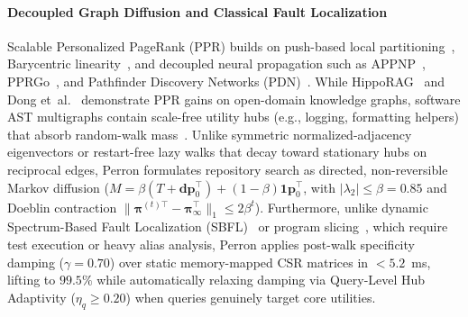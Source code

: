 \documentclass[10pt]{article}
\begin{document}
\paragraph{Decoupled Graph Diffusion and Classical Fault Localization}
Scalable Personalized PageRank (PPR) builds on push-based local partitioning~\cite{andersen2006local}, Barycentric linearity~\cite{jeh2003scaling}, and decoupled neural propagation such as APPNP~\cite{klicpera2019predict}, PPRGo~\cite{bojchevski2020scaling}, and Pathfinder Discovery Networks (PDN)~\cite{rozemberczki2021pdn}. While HippoRAG~\cite{gutierrez2024hipporag} and Dong et~al.~\cite{dong2024dont} demonstrate PPR gains on open-domain knowledge graphs, software AST multigraphs contain scale-free utility hubs (e.g., logging, formatting helpers) that absorb random-walk mass~\cite{liben2007link}. Unlike symmetric normalized-adjacency eigenvectors or restart-free lazy walks that decay toward stationary hubs on reciprocal edges, Perron formulates repository search as directed, non-reversible Markov diffusion ($M = \beta(T + \mathbf{d}\mathbf{p}_0^\top) + (1-\beta)\mathbf{1}\mathbf{p}_0^\top$, with $|\lambda_2| \le \beta = 0.85$ and Doeblin contraction $\|\boldsymbol{\pi}^{(t)\top} - \boldsymbol{\pi}_\infty^\top\|_1 \le 2\beta^t$). Furthermore, unlike dynamic Spectrum-Based Fault Localization (SBFL)~\cite{pearson2017evaluating,zou2021empirical,li2017prfl} or program slicing~\cite{weiser1984program}, which require test execution or heavy alias analysis, Perron applies post-walk specificity damping ($\gamma = 0.70$) over static memory-mapped CSR matrices in $<5.2$~ms, lifting  to $99.5\%$ while automatically relaxing damping via Query-Level Hub Adaptivity ($\eta_q \ge 0.20$) when queries genuinely target core utilities.
\end{document}
